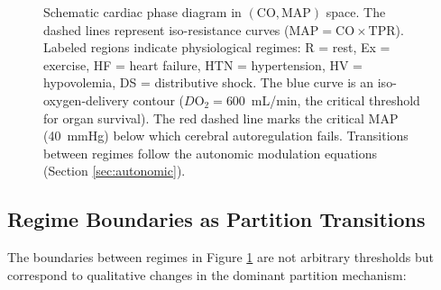 \documentclass[12pt,a4paper]{article}
\theoremstyle{remark}
\newcommand{\CO}{\mathrm{CO}}
\newcommand{\MAP}{\mathrm{MAP}}
\newcommand{\TPR}{\mathrm{TPR}}
\begin{document}
\begin{figure}[h]
\caption{Schematic cardiac phase diagram in $(\CO, \MAP)$ space. The dashed lines represent iso-resistance curves ($\MAP = \CO \times \TPR$). Labeled regions indicate physiological regimes: R = rest, Ex = exercise, HF = heart failure, HTN = hypertension, HV = hypovolemia, DS = distributive shock. The blue curve is an iso-oxygen-delivery contour ($D\mathrm{O}_2 = 600$~mL/min, the critical threshold for organ survival). The red dashed line marks the critical MAP (40~mmHg) below which cerebral autoregulation fails. Transitions between regimes follow the autonomic modulation equations (Section \ref{sec:autonomic}).}
\label{fig:phase_diagram_schematic}
\end{figure}

\subsection{Regime Boundaries as Partition Transitions}

The boundaries between regimes in Figure \ref{fig:phase_diagram_schematic} are not arbitrary thresholds but correspond to qualitative changes in the dominant partition mechanism:
\end{document}
